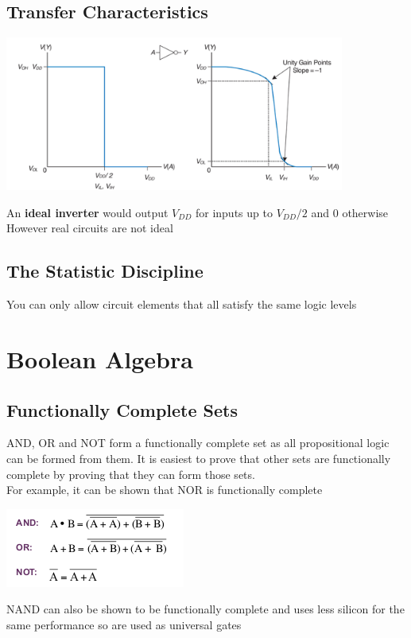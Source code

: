 \documentclass{article}[18pt]
\begin{document}
\subsection{Transfer Characteristics}
\begin{center}
	\includegraphics[scale=0.7]{"Transfer Characteristics"}
\end{center}
An \textbf{ideal inverter} would output $V_{DD}$ for inputs up to $V_{DD}/2$ and 0 otherwise\\
However real circuits are not ideal
\subsection{The Statistic Discipline}
You can only allow circuit elements that all satisfy the same logic levels
\section{Boolean Algebra}
\subsection{Functionally Complete Sets}
AND, OR and NOT form a functionally complete set as all propositional logic can be formed from them. It is easiest to prove that other sets are functionally complete by proving that they can form those sets.\\
For example, it can be shown that NOR is functionally complete
\begin{center}
	\includegraphics[scale=0.7]{NOR}
\end{center}
NAND can also be shown to be functionally complete and uses less silicon for the same performance so are used as universal gates
\end{document}
